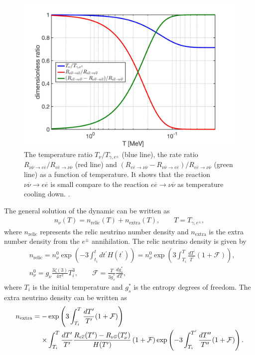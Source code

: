 \begin{figure} 
\begin{center}
\includegraphics[width=0.8\linewidth]{./plots/DimensionlessRatio_ExtraNeutrino}
\caption{The temperature ratio $T_\nu/T_{\gamma,e^\pm}$ (blue line), the rate ratio $R_{\nu\overline{\nu}\rightarrow e\overline{e}}/ R_{e\overline{e}\rightarrow\nu\overline{\nu}}$ (red line) and $(R_{e\overline{e}\rightarrow\nu\overline{\nu}}-R_{\nu\overline{\nu}\rightarrow e\overline{e}})/ R_{e\overline{e}\rightarrow\nu\overline{\nu}}$ (green line) as a function of temperature. It shows that the reaction $\nu\overline{\nu}\rightarrow e\overline{e}$ is small compare to the reaction $e\overline{e}\rightarrow\nu\overline{\nu}$ as temperature cooling down. .}
\label{DimensionlessRatio}
\end{center}
\end{figure}

The general solution of the dynamic  can be written as
\begin{align}
n_\nu(T)=n_\mathrm{relic}(T)+n_\mathrm{extra}(T),\qquad T=T_{\gamma,e^\pm},
\end{align}
where $n_\mathrm{relic}$ represents the relic neutrino number density and $n_\mathrm{extra}$ is the extra number density from the $e^\pm$ annihilation. The relic neutrino density is given by
\begin{align} &n_\mathrm{relic}=n_\nu^0\exp\left(-3\int_{t_i}^t{dt^\prime}H(t^\prime)\right)=n_\nu^0\exp\left(3\int_{T_i}^T\frac{dT^\prime}{T^\prime}(1+\mathcal{F})\right),\\
&n^0_\nu=g_\nu\frac{3\zeta(3)}{4\pi^2}T^3_i,\qquad \mathcal{F}=\frac{T}{3g^\ast_s}\frac{dg^\ast_s}{dT},
\end{align}
where $T_i$ is the initial temperature and $g^\ast_s$ is the entropy degrees of freedom. The extra neutrino density can be written as
\begin{align}
n_\mathrm{extra}=-&\exp\left(3\int_{T_i}^T\frac{dT^\prime}{T^\prime}(1+\mathcal{F})\right)\notag\\
\times&\int_{T_i}^T\frac{dT^\prime}{T^\prime}\frac{R_{e\overline{e}}(T^\prime)-R_{\nu\overline{\nu}}(T^\prime_\nu)}{H(T^\prime)}\left(1+\mathcal{F}\right)\exp\left(-3\int_{T_i}^{T^{\prime}}\frac{dT^{\prime\prime}}{T^{\prime\prime}}(1+\mathcal{F})\right).
\end{align}

